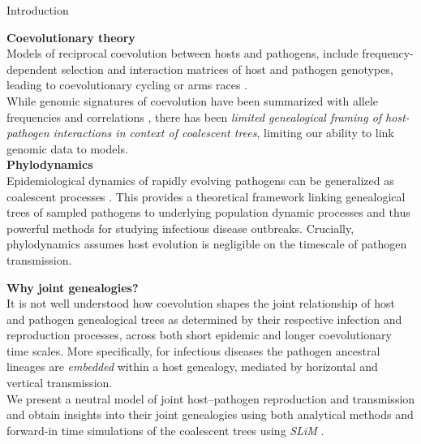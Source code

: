 \documentclass[a0paper,portrait,20pt]{extarticle}
\begin{document}
\begin{nofillbox}{Introduction}
 \begin{minipage}{0.39\textwidth}
     \textbf{Coevolutionary theory}\\
     Models of reciprocal coevolution between hosts and pathogens, include frequency-dependent selection and interaction matrices of host and pathogen genotypes, leading to coevolutionary cycling or arms races \cite{tellier-2021-theor-host}.\\
     While genomic signatures of coevolution have been summarized with allele frequencies and correlations \cite{ebert-2020-host}, there has been \textit{limited genealogical framing of host-pathogen interactions in context of coalescent trees}, limiting our ability to link genomic data to models.\\

     \textbf{Phylodynamics}\\
     Epidemiological dynamics of rapidly evolving pathogens can be generalized as coalescent processes \cite{didelot-2025-ances-proces}. This provides a theoretical framework linking genealogical trees of sampled pathogens to underlying population dynamic processes and thus powerful methods for studying infectious disease outbreaks. Crucially, phylodynamics assumes host evolution is negligible on the timescale of pathogen transmission. 
   \end{minipage}
 \hfill
   \begin{minipage}{0.39\linewidth}
    \textbf{Why joint genealogies?}\\
    It is not well understood how coevolution shapes the joint relationship of host and pathogen genealogical trees as determined by their respective infection and reproduction processes, across both short epidemic and longer coevolutionary time scales.
    More specifically, for infectious diseases the pathogen ancestral lineages are \emph{embedded} within a host genealogy, mediated by horizontal and vertical transmission.\\

    We present a neutral model of joint host--pathogen reproduction and transmission and obtain insights into their joint genealogies using both analytical methods and forward-in time simulations of the coalescent trees using \emph{SLiM} \cite{haller-2023-slim}.
    


\end{minipage}
\end{nofillbox}
\end{document}
